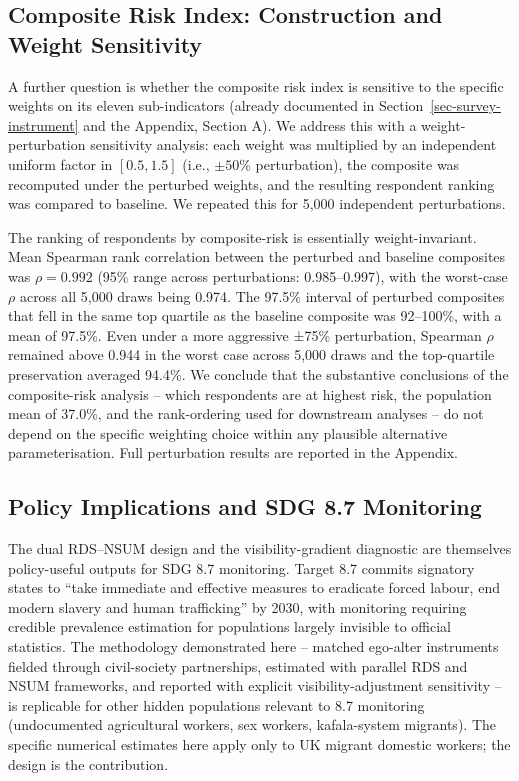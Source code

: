 \documentclass[
  12pt,
  letterpaper,
  DIV=11,
  numbers=noendperiod]{scrartcl}
\begin{document}
\subsection{Composite Risk Index: Construction and Weight
Sensitivity}\label{sec-weights-sensitivity}

A further question is whether the composite risk index is sensitive to
the specific weights on its eleven sub-indicators (already documented in
Section~\ref{sec-survey-instrument} and the Appendix, Section A). We
address this with a weight-perturbation sensitivity analysis: each
weight was multiplied by an independent uniform factor in \([0.5, 1.5]\)
(i.e., \(\pm 50\%\) perturbation), the composite was recomputed under
the perturbed weights, and the resulting respondent ranking was compared
to baseline. We repeated this for 5,000 independent perturbations.

The ranking of respondents by composite-risk is essentially
weight-invariant. Mean Spearman rank correlation between the perturbed
and baseline composites was \(\rho = 0.992\) (95\% range across
perturbations: 0.985--0.997), with the worst-case \(\rho\) across all
5,000 draws being 0.974. The 97.5\% interval of perturbed composites
that fell in the same top quartile as the baseline composite was
92--100\%, with a mean of 97.5\%. Even under a more aggressive ±75\%
perturbation, Spearman \(\rho\) remained above 0.944 in the worst case
across 5,000 draws and the top-quartile preservation averaged 94.4\%. We
conclude that the substantive conclusions of the composite-risk analysis
-- which respondents are at highest risk, the population mean of 37.0\%,
and the rank-ordering used for downstream analyses -- do not depend on
the specific weighting choice within any plausible alternative
parameterisation. Full perturbation results are reported in the
Appendix.

\subsection{Policy Implications and SDG 8.7
Monitoring}\label{sec-policy}

The dual RDS--NSUM design and the visibility-gradient diagnostic are
themselves policy-useful outputs for SDG 8.7 monitoring. Target 8.7
commits signatory states to ``take immediate and effective measures to
eradicate forced labour, end modern slavery and human trafficking'' by
2030, with monitoring requiring credible prevalence estimation for
populations largely invisible to official statistics. The methodology
demonstrated here -- matched ego-alter instruments fielded through
civil-society partnerships, estimated with parallel RDS and NSUM
frameworks, and reported with explicit visibility-adjustment sensitivity
-- is replicable for other hidden populations relevant to 8.7 monitoring
(undocumented agricultural workers, sex workers, kafala-system
migrants). The specific numerical estimates here apply only to UK
migrant domestic workers; the design is the contribution.
\end{document}
